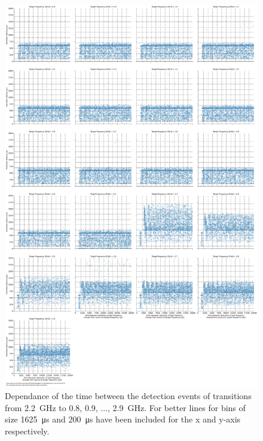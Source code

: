 \begin{figure}[]
    \centering
    \includegraphics[width=\columnwidth]{fig/ftalat/ftalat_scatter_wait_transition_latency_hati_source_2.2.pdf}
    \caption{Dependance of the time between the detection events of transitions from \SI{2.2}{\GHz} to \SI{0.8}{}, \SI{0.9}{}, ..., \SI{2.9}{\GHz}. For better lines for bins of size \SI{1625}{\us} and \SI{200}{\us} have been included for the x and y-axis respectively.}
\end{figure}
